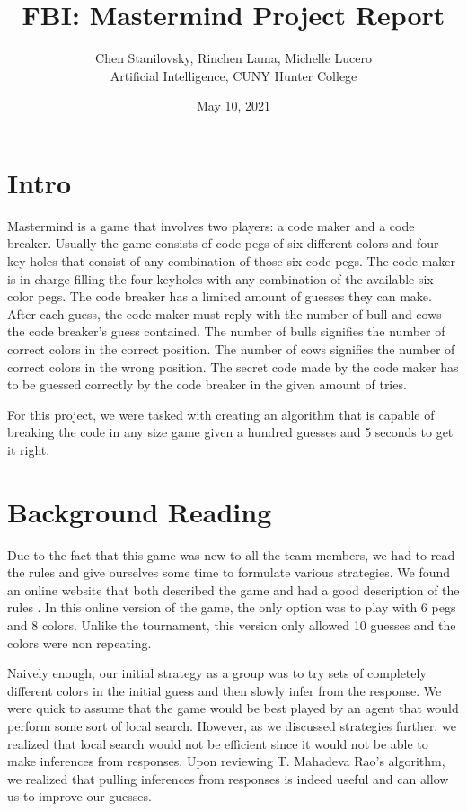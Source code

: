\documentclass[11pt]{article}
\title{\vspace{-3cm}FBI: Mastermind Project Report}
\author{Chen Stanilovsky, Rinchen Lama, Michelle Lucero\\Artificial Intelligence, CUNY Hunter College}
\date{May 10, 2021}
\begin{document}
\maketitle
    \section{Intro}
    
    Mastermind is a game that involves two players: a code maker and a code breaker. Usually the game consists of code pegs of six different colors and four key holes that consist of any combination of those six code pegs. The code maker is in charge filling the four keyholes with any combination of the available six color pegs. The code breaker has a limited amount of guesses they can make. After each guess, the code maker must reply with the number of bull and cows the code breaker’s guess contained. The number of bulls signifies the number of correct colors in the correct position. The number of cows signifies the number of correct colors in the wrong position. The secret code made by the code maker has to be guessed correctly by the code breaker in the given amount of tries.
    
    For this project, we were tasked with creating an algorithm that is capable of breaking the code in any size game given a hundred guesses and 5 seconds to get it right.
    
    \section{Background Reading}

    Due to the fact that this game was new to all the team members, we had to read the rules and give ourselves some time to formulate various strategies. We found an online website that both described the game and had a good description of the rules \autocite{rules}. In this online version of the game, the only option was to play with 6 pegs and 8 colors. Unlike the tournament, this version only allowed 10 guesses and the colors were non repeating. 
    
    Naively enough, our initial strategy as a group was to try sets of completely different colors in the initial guess and then slowly infer from the response. We were quick to assume that the game would be best played by an agent that would perform some sort of local search. However, as we discussed strategies further, we realized that local search would not be efficient since it would not be able to make inferences from responses. Upon reviewing T. Mahadeva Rao's algorithm\autocite{rao}, we realized that pulling inferences from responses is indeed useful and can allow us to improve our guesses.
\end{document}
